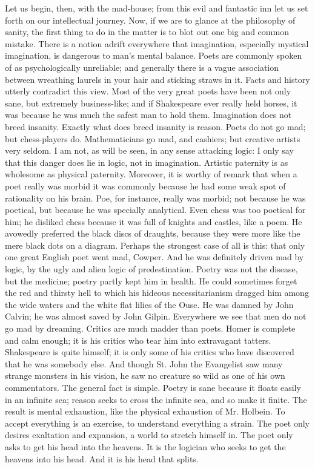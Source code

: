 Let us begin, then, with the mad-house; from this evil and fantastic inn let us set forth on our intellectual journey. Now, if we are to glance at the philosophy of sanity, the first thing to do in the matter is to blot out one big and common mistake. There is a notion adrift everywhere that imagination, especially mystical imagination, is dangerous to man’s mental balance. Poets are commonly spoken of as psychologically unreliable; and generally there is a vague association between wreathing laurels in your hair and sticking straws in it. Facts and history utterly contradict this view. Most of the very great poets have been not only sane, but extremely business-like; and if Shakespeare ever really held horses, it was because he was much the safest man to hold them. Imagination does not breed insanity. Exactly what does breed insanity is reason. Poets do not go mad; but chess-players do. Mathematicians go mad, and cashiers; but creative artists very seldom. I am not, as will be seen, in any sense attacking logic: I only say that this danger does lie in logic, not in imagination. Artistic paternity is as wholesome as physical paternity. Moreover, it is worthy of remark that when a poet really was morbid it was commonly because he had some weak spot of rationality on his brain. Poe, for instance, really was morbid; not because he was poetical, but because he was specially analytical. Even chess was too poetical for him; he disliked chess because it was full of knights and castles, like a poem. He avowedly preferred the black discs of draughts, because they were more like the mere black dots on a diagram. Perhaps the strongest case of all is this: that only one great English poet went mad, Cowper. And he was definitely driven mad by logic, by the ugly and alien logic of predestination. Poetry was not the disease, but the medicine; poetry partly kept him in health. He could sometimes forget the red and thirsty hell to which his hideous necessitarianism dragged him among the wide waters and the white flat lilies of the Ouse. He was damned by John Calvin; he was almost saved by John Gilpin. Everywhere we see that men do not go mad by dreaming. Critics are much madder than poets. Homer is complete and calm enough; it is his critics who tear him into extravagant tatters. Shakespeare is quite himself; it is only some of his critics who have discovered that he was somebody else. And though St. John the Evangelist saw many strange monsters in his vision, he saw no creature so wild as one of his own commentators. The general fact is simple. Poetry is sane because it floats easily in an infinite sea; reason seeks to cross the infinite sea, and so make it finite. The result is mental exhaustion, like the physical exhaustion of Mr. Holbein. To accept everything is an exercise, to understand everything a strain. The poet only desires exaltation and expansion, a world to stretch himself in. The poet only asks to get his head into the heavens. It is the logician who seeks to get the heavens into his head. And it is his head that splits.

